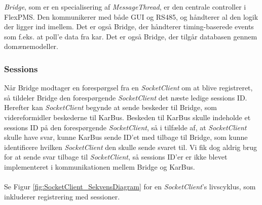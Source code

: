 \textit{Bridge}, som er en specialisering af \textit{MessageThread}, er den centrale controller i FlexPMS. Den kommunikerer med både GUI og RS485, og håndterer al den logik der ligger ind imellem. Det er også Bridge, der håndterer timing-baserede events som f.eks. at poll'e data fra kar. Det er også Bridge, der tilgår databasen gennem domænemodeller.


\subsubsection{Sessions}
Når Bridge modtager en forespørgsel fra en \textit{SocketClient} om at blive registreret, så tildeler Bridge den forespørgende \textit{SocketClient} det næste ledige sessions ID. Herefter kan \textit{SocketClient} begynde at sende beskeder til Bridge, som videreformidler beskederne til KarBus. Beskeden til KarBus skulle indeholde et sessions ID på den forespørgende \textit{SocketClient}, så i tilfælde af, at \textit{SocketClient} skulle have svar, kunne KarBus sende ID’et med tilbage til Bridge, som kunne identificere hvilken \textit{SocketClient} den skulle sende svaret til. Vi fik dog aldrig brug for at sende svar tilbage til \textit{SocketClient}, så sessions ID'er er ikke blevet implementeret i kommunikationen mellem Bridge og KarBus.\\\\

Se Figur \ref{fig:SocketClient_SekvensDiagram} for en \textit{SocketClient}'s livscyklus, som inkluderer registrering med sessioner.
